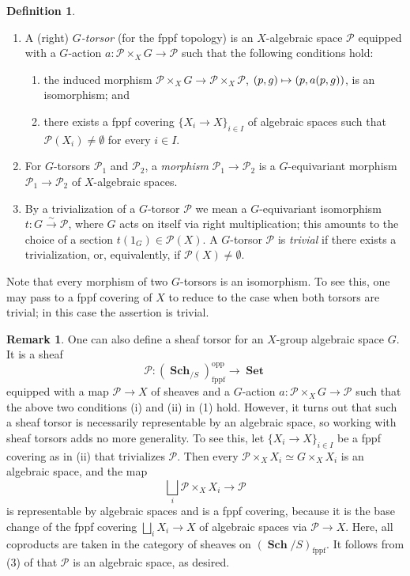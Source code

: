 \documentclass[JEP,XML,SOM,Unicode,published]{cedram}
\newenvironment{enumeratei}
{\bgroup\def\theenumi{\roman{enumi}}\def\theenumii{\arabic{enumii}}\begin{enumerate}}
{\end{enumerate}\egroup}
\newcommand\mto{\mathchoice{\longmapsto}{\mapsto}{\mapsto}{\mapsto}}
\let\ts\textstyle
\newcommand{\cP}{\mathcal{P}}
\newcommand{\isoto}{\overset{\sim}{\longrightarrow}}
\newcommand{\fppf}{\mathrm{fppf}}
\DeclareMathOperator{\Set}{\textbf{Set}}
\DeclareMathOperator{\Sch}{\textbf{Sch}}
\newcommand{\bremt}{\begin{rem-tweak}}
\newcommand{\eremt}{\end{rem-tweak}}
\newcommand{\benumr}{\begin{enumeratei}}
\newcommand{\eenumr}{\end{enumeratei}}
\providecommand{\SP}[1]{\cite[\href{https://stacks.math.columbia.edu/tag/#1}{#1}]{SP}}
\theoremstyle{plain}
\theoremstyle{definition}
\newtheorem{defn-tweak}[subsection]{Definition}
\newtheorem{rem-tweak}[subsection]{Remark}
\begin{document}
\skpt\begin{defn-tweak} \label{def of torsos}
\begin{enumerate}
\item A (right) \emph{$G$-torsor} (for the fppf topology) is an $X$-algebraic space $\cP$ equipped with a $G$-action $a:\cP\times_X G \to \cP$ such that the following conditions hold:
\benumr\def\theenumii{\roman{enumii}}
\item the induced morphism $\cP\times_X G\to \cP \times_X \cP$, $(p,g)\mto (p,a(p,g))$, is an isomorphism; and
\item there exists a fppf covering $\{X_i\to X\}_{i\in I}$ of algebraic spaces \SP{03Y8} such that $\cP(X_i)\neq \emptyset$ for every $i\in I$.
\eenumr
\item For $G$-torsors $\cP_1$ and $\cP_2$, a \emph{morphism} $\cP_1 \to \cP_2$ is a $G$-equivariant morphism $\cP_1\to \cP_2$ of $X$-algebraic spaces.
\item By a trivialization of a $G$-torsor $\cP$ we mean a $G$-equivariant isomorphism $t:G \isoto \cP$, where $G$ acts on itself via right multiplication; this amounts to the choice of a section $t(1_G)\in \cP(X)$. A $G$-torsor $\cP$ is \emph{trivial} if there exists a trivialization, or, equivalently, if $\cP(X)\neq \emptyset$.
\end{enumerate}
\end{defn-tweak}

Note that every morphism of two $G$-torsors is an isomorphism. To see this, one may pass to a fppf covering of $X$ to reduce to the case when both torsors are trivial; in this case the assertion is trivial.

\bremt
One can also define a sheaf torsor for an $X$-group algebraic space $G$. It is a sheaf
\[
\cP:(\Sch_{/S})_{\fppf}^{\mathrm{opp}}\to \Set
\]
equipped with a map $\cP\to X$ of sheaves and a $G$-action $a:\cP\times_X G \to \cP$ such that the above two conditions (i) and (ii) in (1) hold. However, it turns out that such a sheaf torsor is necessarily representable by an algebraic space, so working with sheaf torsors adds no more generality. To see this, let $\{X_i\to X\}_{i\in I}$ be a fppf covering as in (ii) that trivializes $\cP$. Then every $\cP\times_XX_i\simeq G\times_XX_i$ is an algebraic space, and the map
\[
\ts \bigsqcup_i\cP\times_XX_i\to \cP
\]
is representable by algebraic spaces and is a fppf covering, because it is the base change of the fppf covering $\bigsqcup_i X_i\to X$ of algebraic spaces via $\cP\to X$. Here, all coproducts are taken in the category of sheaves on $(\Sch/S)_{\fppf}$. It follows from (3) of \SP{04S6} that $\cP$ is an algebraic space, as desired.
\eremt
\end{document}
